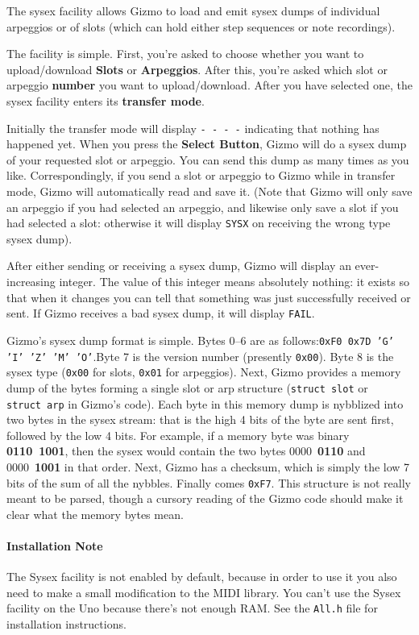 \documentclass{article}
\begin{document}
	The sysex facility allows Gizmo to load and emit sysex dumps of individual arpeggios or of slots (which can hold either step sequences or note recordings).
	
	The facility is simple.  First, you're asked to choose whether you want to upload/download {\bf Slots} or {\bf Arpeggios}.  After this, you're asked which slot or arpeggio {\bf number} you want to upload/download.  After you have selected one, the sysex facility enters its {\bf transfer mode}.
	
Initially the transfer mode will display \texttt{-~-~-~-} indicating that nothing has happened yet.  When you press the {\bf Select Button}, Gizmo will do a sysex dump of your requested slot or arpeggio.  You can send this dump as many times as you like.  Correspondingly, if you send a slot or arpeggio to Gizmo while in transfer mode, Gizmo will automatically read and save it.  (Note that Gizmo will only save an arpeggio if you had selected an arpeggio, and likewise only save a slot if you had selected a slot: otherwise it will display \texttt{SYSX} on receiving the wrong type sysex dump).

After either sending or receiving a sysex dump, Gizmo will display an ever-increasing integer.  The value of this integer means absolutely nothing: it exists so that when it changes you can tell that something was just successfully received or sent.  If Gizmo receives a bad sysex dump, it will display \texttt{FAIL}.

Gizmo's sysex dump format is simple.  Bytes 0--6 are as follows:\quad\texttt{0xF0 0x7D 'G' 'I' 'Z' 'M' 'O'}.\quad  Byte 7 is the version number (presently \texttt{0x00}). Byte 8 is the sysex type (\texttt{0x00} for slots, \texttt{0x01} for arpeggios).  Next, Gizmo provides a memory dump of the bytes forming a single slot or arp structure (\texttt{struct~{\textunderscore}slot} or \texttt{struct~{\textunderscore}arp} in Gizmo's code).  Each byte in this memory dump is nybblized into two bytes in the sysex stream: that is the high 4 bits of the byte are sent first, followed by the low 4 bits.  For example, if a memory byte was binary {\bf 0110\ 1001}, then the sysex would contain the two bytes 0000\ {\bf 0110} and 0000\ {\bf 1001} in that order.  Next, Gizmo has a checksum, which is simply the low 7 bits of the sum of all the nybbles.  Finally comes \texttt{0xF7}.   This structure is not really meant to be parsed, though a cursory reading of the Gizmo code should make it clear what the memory bytes mean.

\paragraph{Installation Note} The Sysex facility is not enabled by default, because in order to use it you also need to make a small modification to the MIDI library.  You can't use the Sysex facility on the Uno because there's not enough RAM.  See the {\tt All.h} file for installation instructions.
\end{document}
